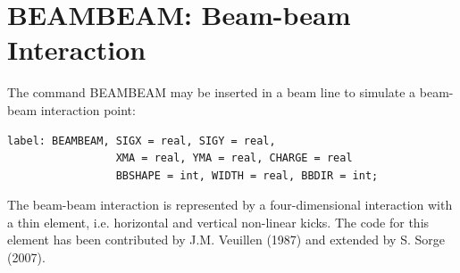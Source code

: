 
\section{BEAMBEAM: Beam-beam Interaction}
 
The command BEAMBEAM may be inserted in a beam line to simulate a
beam-beam interaction point:  
 
\begin{verbatim}
label: BEAMBEAM, SIGX = real, SIGY = real,
                 XMA = real, YMA = real, CHARGE = real
                 BBSHAPE = int, WIDTH = real, BBDIR = int;
\end{verbatim}

The beam-beam interaction is represented by a four-dimensional
interaction with a thin element, i.e. horizontal and vertical non-linear kicks.
The code for this element has been contributed by J.M. Veuillen (1987)
and extended by S. Sorge (2007).  
 
